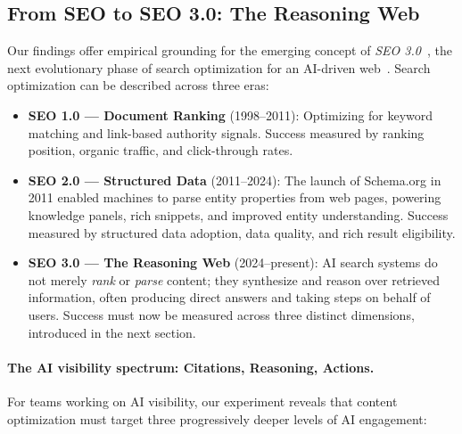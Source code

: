 \documentclass[runningheads]{llncs}
\begin{document}
\subsection{From SEO to SEO 3.0: The Reasoning Web}

Our findings offer empirical grounding for the emerging concept of
\emph{SEO 3.0}~\cite{volpini2025seo3}, the next evolutionary phase
of search optimization for an AI-driven
web~\cite{gartner2024disruptive}. Search optimization can be
described across three eras:

\begin{itemize}
    \item \textbf{SEO 1.0 --- Document Ranking} (1998--2011): Optimizing
          for keyword matching and link-based authority signals.
          Success measured by ranking position, organic traffic, and
          click-through rates.
    \item \textbf{SEO 2.0 --- Structured Data} (2011--2024): The
          launch of Schema.org in 2011 enabled machines to parse entity
          properties from web pages, powering knowledge panels, rich
          snippets, and improved entity understanding. Success measured
          by structured data adoption, data quality, and rich result
          eligibility.
    \item \textbf{SEO 3.0 --- The Reasoning Web} (2024--present):
          AI search systems do not merely \emph{rank} or \emph{parse}
          content; they synthesize and reason over retrieved information,
          often producing direct answers and taking steps on behalf of
          users. Success must now be measured across three distinct
          dimensions, introduced in the next section.
\end{itemize}

\paragraph{The AI visibility spectrum: Citations, Reasoning, Actions.}
For teams working on AI visibility, our experiment reveals that
content optimization must target three progressively deeper levels of
AI engagement:
\end{document}
